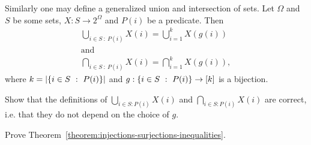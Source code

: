 Similarly one may define a generalized union and intersection of sets.
Let $\Omega$ and $S$ be some sets, $X : S \to 2^\Omega$ and $P(i)$ be a
predicate. Then
\begin{gather*}
    \bigcup_{i \in S ~:~ P(i)} X(i) = \bigcup_{i = 1}^k X(g(i)) \\
    \text{and}\\
    \bigcap_{i \in S ~:~ P(i)} X(i) = \bigcap_{i = 1}^k X(g(i)),
\end{gather*}
where $k = \cardinality{\set[P(i)]{i \in S}}$ and $g : \set[P(i)]{i \in S} \to \range{k}$ is
a bijection.

\begin{exercise}
    Show that the definitions of $\bigcup_{i \in S : P(i)} X(i)$ and
    $\bigcap_{i \in S : P(i)} X(i)$ are correct,
    i.e. that they do not depend on the choice of $g$.
\end{exercise}


\begin{chapterendexercises}
    \exercise Prove Theorem~\ref{theorem:injections-surjections-inequalities}.
\end{chapterendexercises}

